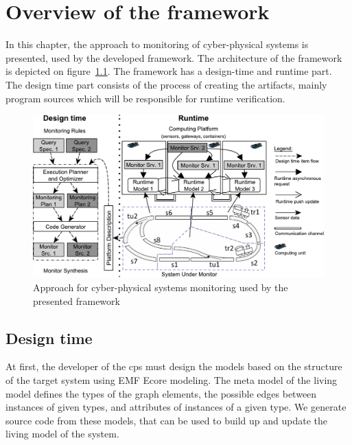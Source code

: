 
\chapter{Overview of the framework}


In this chapter, the approach to monitoring of cyber-physical systems is presented, used by the developed framework. 
The architecture of the framework is depicted on figure~\ref{fig:approach}. 
The framework has a design-time and runtime part.
The design time part consists of the process of creating the artifacts, mainly program sources which will be responsible for runtime verification.

\begin{figure}[h]
	\begin{center}
		\includegraphics[width=\textwidth]{figures/fase-overview-crop.pdf}
		\caption{Approach for cyber-physical systems monitoring used by the presented framework }
		\label{fig:approach}
	\end{center}
\end{figure}

\section{Design time}

At first, the developer of the cps must design the models based on the structure of the target system using EMF Ecore modeling. 
The meta model of the living model defines the types of the graph elements, the possible edges between instances of given types, and attributes of instances of a given type. 
We generate \cpp{} source code from these models, that can be used to build up and update the living model of the system.

